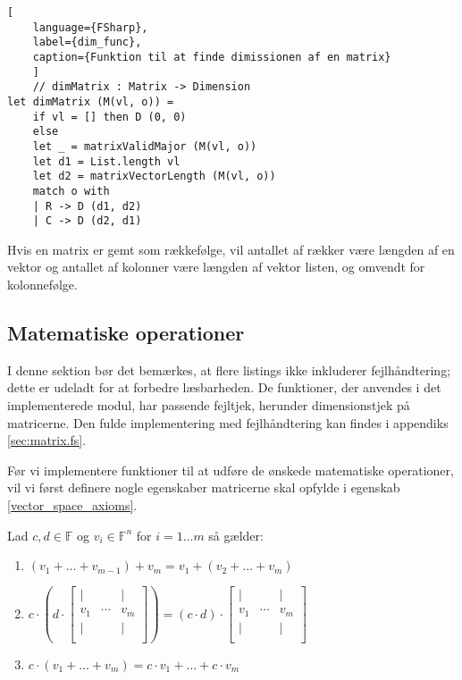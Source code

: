 \begin{lstlisting}[
    language={FSharp}, 
    label={dim_func}, 
    caption={Funktion til at finde dimissionen af en matrix}
    ]
    // dimMatrix : Matrix -> Dimension
let dimMatrix (M(vl, o)) =
    if vl = [] then D (0, 0)
    else
    let _ = matrixValidMajor (M(vl, o))
    let d1 = List.length vl
    let d2 = matrixVectorLength (M(vl, o))
    match o with
    | R -> D (d1, d2)
    | C -> D (d2, d1)
\end{lstlisting}

Hvis en matrix er gemt som rækkefølge, vil antallet af rækker være længden af en vektor og antallet af kolonner være længden af vektor listen, og omvendt for kolonnefølge.

\subsection{Matematiske operationer}
I denne sektion bør det bemærkes, at flere listings ikke inkluderer fejlhåndtering; dette er udeladt for at forbedre læsbarheden. De funktioner, der anvendes i det implementerede modul, har passende fejltjek, herunder dimensionstjek på matricerne. Den fulde implementering med fejlhåndtering kan findes i appendiks \ref{sec:matrix.fs}.

Før vi implementere funktioner til at udføre de ønskede matematiske operationer, vil vi først definere nogle egenskaber matricerne skal opfylde i egenskab \ref{vector_space_axioms}.
\vspace{0.5cm}
\begin{egenskab}\label{vector_space_axioms}
    Lad $c, d \in \mathbb{F}$ og $v_i \in \mathbb{F}^n$ for $i = 1 \dots m$ så gælder:
    \begin{enumerate}
        \item $(v_1 + \dots + v_{m-1}) + v_m = v_1 + (v_2 + \dots + v_m)$
        \item $c \cdot \left(d \cdot \begin{bmatrix}
            | &        & | \\
            v_{1} & \cdots & v_{m} \\
            | &        & | \\
        \end{bmatrix}\right) = (c \cdot d) \cdot \begin{bmatrix}
            | &        & | \\
            v_{1} & \cdots & v_{m} \\
            | &        & | \\
        \end{bmatrix}$
        
        \item $c \cdot (v_1 + \dots +v_m) = c \cdot v_1 + \dots +c \cdot v_m$
    \end{enumerate}
\end{egenskab}


